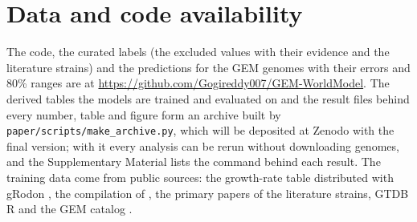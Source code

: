 \section{Data and code availability}
The code, the curated labels (the excluded values with their evidence and the literature strains) and the predictions for
the \NGEMPredicted GEM genomes with their errors and 80\% ranges are at \url{https://github.com/Gogireddy007/GEM-WorldModel}.
The derived tables the models are trained and evaluated on and the result files behind every number, table and figure
form an archive built by \texttt{paper/scripts/make\_archive.py}, which will be deposited at Zenodo with the final
version; with it every analysis can be rerun without downloading genomes, and the Supplementary Material lists the command
behind each result. The training data come from public sources: the growth-rate table distributed with gRodon
\citep{weissman2021}, the compilation of \citet{madin2020}, the primary papers of the literature strains, GTDB
R\GTDBRelease \citep{parks2022} and the GEM catalog \citep{nayfach2021}.
